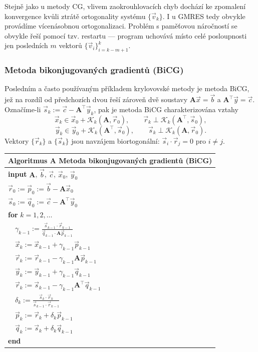 \documentclass{article}
\newcommand{\0}{\vec{0}}
\newcommand{\A}{\mat A}
\newcommand{\algoritmus}[2]{\vspace{2mm}\begin{tabular}{l}
\hline
{\bf Algoritmus A\arabic{algocntr}} #1\\
\hline
#2\\
\hline
\end{tabular}\vspace{2mm}
\addtocounter{algocntr}{1}}
\newcommand{\bb}{\vec{b}}
\newcommand{\cc}{\vec{c}}
\newcommand{\mat}[1]{\mathbf{#1}}
\newcommand{\norm}[1]{\|#1\|}
\newcommand{\pp}{\vec{p}}
\newcommand{\qq}{\vec{q}}
\newcommand{\rr}{\vec{r}}
\renewcommand{\ss}{\vec{s}}
\newcommand{\vv}{\vec{v}}
\newcommand{\ww}{\vec{w}}
\newcommand{\xx}{\vec{x}}
\newcommand{\yy}{\vec{y}}
\newcounter{algocntr}
\begin{document}
% 

Stejně jako u metody CG, vlivem zaokrouhlovacích chyb dochází ke zpomalení konvergence kvůli ztrátě ortogonality systému $\{\vv_k\}$.
I u GMRES tedy obvykle provádíme vícenásobnou ortogonalizaci.
Problém s paměťovou náročností se obvykle řeší pomocí tzv. restartu --- program uchovává místo celé posloupnosti jen posledních $m$ vektorů $\{\vv_i\}_{i=k-m+1}^k$.




\subsubsection{Metoda bikonjugovaných gradientů (BiCG)}
Posledním a často používaným příkladem krylovovské metody je metoda BiCG, jež na rozdíl od předchozích dvou řeší zároveň dvě soustavy $\A\xx=\bb$ a $\A^\top\yy=\cc$.
Označíme-li $\ss_k:=\cc-\A^\top\yy_k$, pak je metoda BiCG charakterizována vztahy
$$ \xx_k\in\xx_0+\mathcal K_k(\A,\rr_0),\qquad \rr_k\perp\mathcal K_k(\A^\top,\ss_0), $$
$$ \yy_k\in\yy_0+\mathcal K_k(\A^\top,\ss_0),\qquad \ss_k\perp\mathcal K_k(\A,\rr_0). $$
Vektory $\{\rr_k\}$ a $\{\ss_k\}$ jsou navzájem biortogonální: $\ss_i\cdot\rr_j=0$ pro $i\neq j$.

\algoritmus{Metoda bikonjugovaných gradientů (BiCG)}{
{\bf input} $\A$, $\bb$, $\cc$, $\xx_0$, $\yy_0$\\
$\rr_0:=\pp_0:=\bb-\A\xx_0$\\
$\ss_0:=\qq_0:=\cc-\A^\top\yy_0$\\
{\bf for }$k=1,2,\ldots$\\
$\quad \gamma_{k-1}:=\frac{\ss_{k-1}\cdot\rr_{k-1}}{\qq_{k-1}\cdot\A\pp_{k-1}}$\\
$\quad \xx_k:=\xx_{k-1}+\gamma_{k-1}\pp_{k-1}$\\
$\quad \rr_k:=\rr_{k-1}-\gamma_{k-1}\A\pp_{k-1}$\\
$\quad \yy_k:=\yy_{k-1}+\gamma_{k-1}\qq_{k-1}$\\
$\quad \rr_k:=\ss_{k-1}-\gamma_{k-1}\A^\top\qq_{k-1}$\\
$\quad \delta_k:=\frac{\ss_k\cdot\rr_k}{\ss_{k-1}\cdot\rr_{k-1}}$\\
$\quad \pp_k:=\rr_k+\delta_k\pp_{k-1}$\\
$\quad \qq_k:=\ss_k+\delta_k\qq_{k-1}$\\
{\bf end}
}
\end{document}

